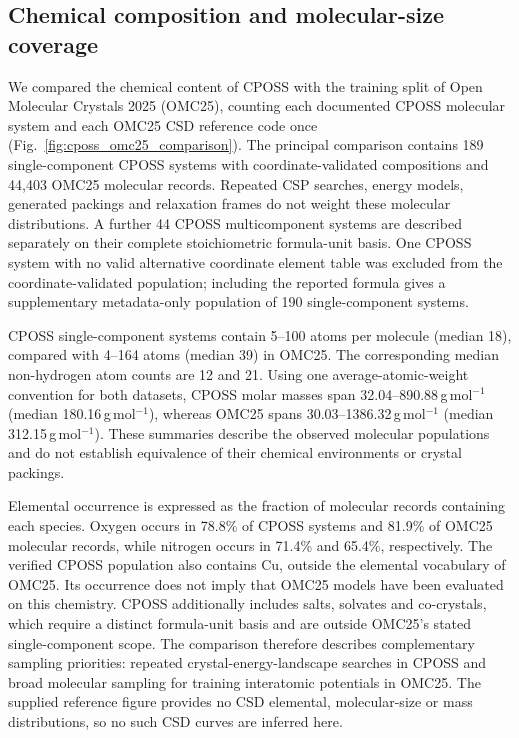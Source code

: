 \documentclass[11pt]{article}
\begin{document}
\fi

\subsection{Chemical composition and molecular-size coverage}
We compared the chemical content of CPOSS with the training split of Open Molecular Crystals 2025 (OMC25)\cite{gharakhanyan2026omc25}, counting each documented CPOSS molecular system and each OMC25 CSD reference code once (Fig.~\ref{fig:cposs_omc25_comparison}). The principal comparison contains 189 single-component CPOSS systems with coordinate-validated compositions and 44,403 OMC25 molecular records. Repeated CSP searches, energy models, generated packings and relaxation frames do not weight these molecular distributions. A further 44 CPOSS multicomponent systems are described separately on their complete stoichiometric formula-unit basis. One CPOSS system with no valid alternative coordinate element table was excluded from the coordinate-validated population; including the reported formula gives a supplementary metadata-only population of 190 single-component systems.

CPOSS single-component systems contain 5--100 atoms per molecule (median 18), compared with 4--164 atoms (median 39) in OMC25. The corresponding median non-hydrogen atom counts are 12 and 21. Using one average-atomic-weight convention for both datasets, CPOSS molar masses span 32.04--890.88\,g\,mol$^{-1}$ (median 180.16\,g\,mol$^{-1}$), whereas OMC25 spans 30.03--1386.32\,g\,mol$^{-1}$ (median 312.15\,g\,mol$^{-1}$). These summaries describe the observed molecular populations and do not establish equivalence of their chemical environments or crystal packings.

Elemental occurrence is expressed as the fraction of molecular records containing each species. Oxygen occurs in 78.8\% of CPOSS systems and 81.9\% of OMC25 molecular records, while nitrogen occurs in 71.4\% and 65.4\%, respectively. The verified CPOSS population also contains Cu, outside the elemental vocabulary of OMC25. Its occurrence does not imply that OMC25 models have been evaluated on this chemistry. CPOSS additionally includes salts, solvates and co-crystals, which require a distinct formula-unit basis and are outside OMC25's stated single-component scope. The comparison therefore describes complementary sampling priorities: repeated crystal-energy-landscape searches in CPOSS and broad molecular sampling for training interatomic potentials in OMC25. The supplied reference figure provides no CSD elemental, molecular-size or mass distributions, so no such CSD curves are inferred here.
\end{document}
